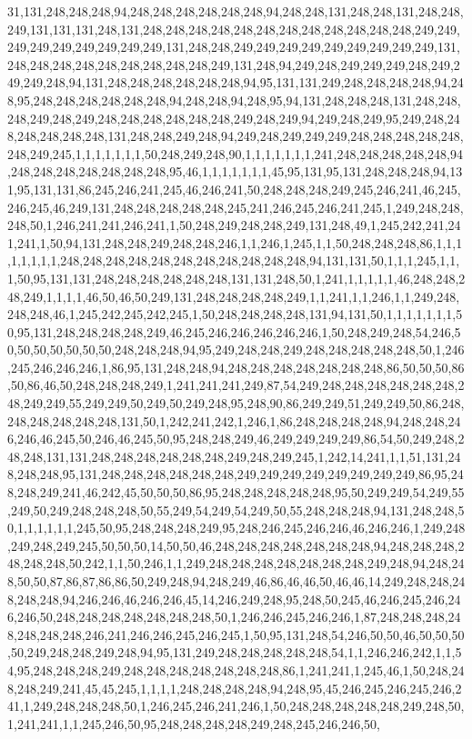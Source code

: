 31,131,248,248,248,94,248,248,248,248,248,248,94,248,248,131,248,248,131,248,248,249,131,131,131,248,131,248,248,248,248,248,248,248,248,248,248,248,248,249,249,249,249,249,249,249,249,249,131,248,248,249,249,249,249,249,249,249,249,249,131,248,248,248,248,248,248,248,248,248,249,131,248,94,249,248,249,249,249,248,249,249,249,248,94,131,248,248,248,248,248,248,94,95,131,131,249,248,248,248,248,94,248,95,248,248,248,248,248,248,94,248,248,94,248,95,94,131,248,248,248,131,248,248,248,249,248,249,248,248,248,248,248,248,249,248,249,94,249,248,249,95,249,248,248,248,248,248,248,131,248,248,249,248,94,249,248,249,249,249,248,248,248,248,248,248,249,245,1,1,1,1,1,1,1,50,248,249,248,90,1,1,1,1,1,1,1,241,248,248,248,248,248,94,248,248,248,248,248,248,248,95,46,1,1,1,1,1,1,1,45,95,131,95,131,248,248,248,94,131,95,131,131,86,245,246,241,245,46,246,241,50,248,248,248,249,245,246,241,46,245,246,245,46,249,131,248,248,248,248,248,245,241,246,245,246,241,245,1,249,248,248,248,50,1,246,241,241,246,241,1,50,248,249,248,248,249,131,248,49,1,245,242,241,241,241,1,50,94,131,248,248,249,248,248,246,1,1,246,1,245,1,1,50,248,248,248,86,1,1,1,1,1,1,1,1,248,248,248,248,248,248,248,248,248,248,248,94,131,131,50,1,1,1,245,1,1,1,50,95,131,131,248,248,248,248,248,248,131,131,248,50,1,241,1,1,1,1,1,46,248,248,248,249,1,1,1,1,46,50,46,50,249,131,248,248,248,248,249,1,1,241,1,1,246,1,1,249,248,248,248,46,1,245,242,245,242,245,1,50,248,248,248,248,131,94,131,50,1,1,1,1,1,1,1,50,95,131,248,248,248,248,249,46,245,246,246,246,246,246,1,50,248,249,248,54,246,50,50,50,50,50,50,50,248,248,248,94,95,249,248,248,249,248,248,248,248,248,50,1,246,245,246,246,246,1,86,95,131,248,248,94,248,248,248,248,248,248,248,86,50,50,50,86,50,86,46,50,248,248,248,249,1,241,241,241,249,87,54,249,248,248,248,248,248,248,248,249,249,55,249,249,50,249,50,249,248,95,248,90,86,249,249,51,249,249,50,86,248,248,248,248,248,248,131,50,1,242,241,242,1,246,1,86,248,248,248,248,94,248,248,246,246,46,245,50,246,46,245,50,95,248,248,249,46,249,249,249,249,86,54,50,249,248,248,248,131,131,248,248,248,248,248,248,249,248,249,245,1,242,14,241,1,1,51,131,248,248,248,95,131,248,248,248,248,248,248,249,249,249,249,249,249,249,249,86,95,248,248,249,241,46,242,45,50,50,50,86,95,248,248,248,248,248,95,50,249,249,54,249,55,249,50,249,248,248,248,50,55,249,54,249,54,249,50,55,248,248,248,94,131,248,248,50,1,1,1,1,1,1,245,50,95,248,248,248,249,95,248,246,245,246,246,46,246,246,1,249,248,249,248,249,245,50,50,50,14,50,50,46,248,248,248,248,248,248,248,94,248,248,248,248,248,248,50,242,1,1,50,246,1,1,249,248,248,248,248,248,248,248,249,248,94,248,248,50,50,87,86,87,86,86,50,249,248,94,248,249,46,86,46,46,50,46,46,14,249,248,248,248,248,248,94,246,246,46,246,246,45,14,246,249,248,95,248,50,245,46,246,245,246,246,246,50,248,248,248,248,248,248,248,50,1,246,246,245,246,246,1,87,248,248,248,248,248,248,248,246,241,246,246,245,246,245,1,50,95,131,248,54,246,50,50,46,50,50,50,50,249,248,248,249,248,94,95,131,249,248,248,248,248,248,54,1,1,246,246,242,1,1,54,95,248,248,248,249,248,248,248,248,248,248,248,86,1,241,241,1,245,46,1,50,248,248,248,249,241,45,45,245,1,1,1,1,248,248,248,248,94,248,95,45,246,245,246,245,246,241,1,249,248,248,248,50,1,246,245,246,241,246,1,50,248,248,248,248,248,249,248,50,1,241,241,1,1,245,246,50,95,248,248,248,248,249,248,245,246,246,50,